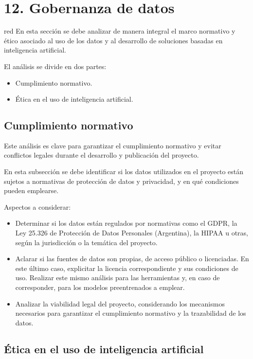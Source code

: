 \section{12. Gobernanza de datos}
\label{sec:gobernanza}


\begin{consigna}{red}
En esta sección se debe analizar de manera integral el marco normativo y ético asociado al uso de los datos y al desarrollo de soluciones basadas en inteligencia artificial.

El análisis se divide en dos partes:

\begin{itemize}
  \item Cumplimiento normativo.
  \item Ética en el uso de inteligencia artificial.
\end{itemize}

\subsection{Cumplimiento normativo}
Este análisis es clave para garantizar el cumplimiento normativo y evitar conflictos legales durante el desarrollo y publicación del proyecto.

En esta subsección se debe identificar si los datos utilizados en el proyecto están sujetos a normativas de protección de datos y privacidad, y en qué condiciones pueden emplearse.

Aspectos a considerar:

\begin{itemize}
  \item Determinar si los datos están regulados por normativas como el GDPR, la Ley 25.326 de Protección de Datos Personales (Argentina), la HIPAA u otras, según la jurisdicción o la temática del proyecto.
  \item Aclarar si las fuentes de datos son propias, de acceso público o licenciadas. En este último caso, explicitar la licencia correspondiente y sus condiciones de uso. Realizar este mismo análisis para las herramientas y, en caso de corresponder, para los modelos preentrenados a emplear.
  \item Analizar la viabilidad legal del proyecto, considerando los mecanismos necesarios para garantizar el cumplimiento normativo y la trazabilidad de los datos.
\end{itemize}

\subsection{Ética en el uso de inteligencia artificial}


\end{consigna}
